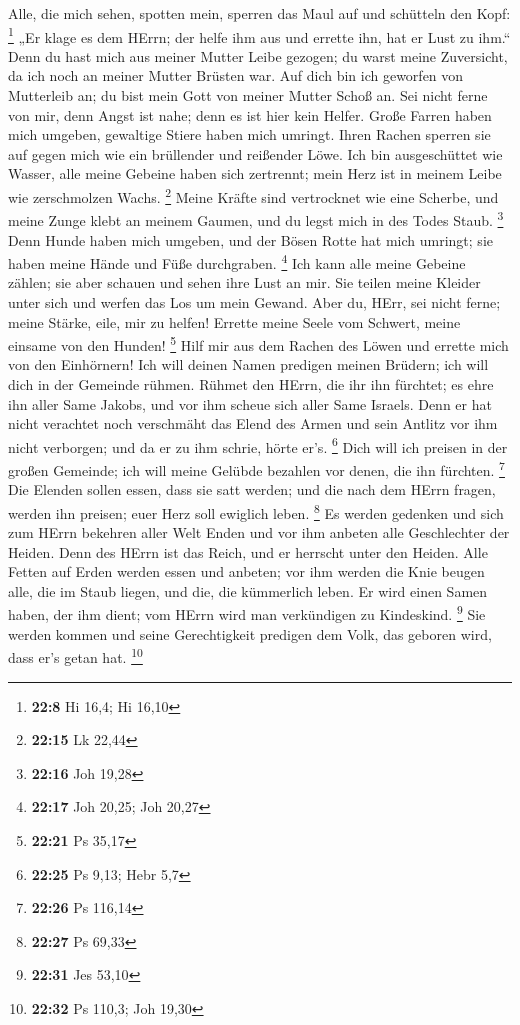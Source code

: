  Alle, die mich sehen, spotten mein, sperren das Maul auf
und schütteln den Kopf: \footnote{\textbf{22:8} Hi 16,4; Hi 16,10}
 „Er klage es dem HErrn; der helfe ihm aus und errette ihn,
hat er Lust zu ihm.``  Denn du hast mich aus meiner Mutter
Leibe gezogen; du warst meine Zuversicht, da ich noch an meiner Mutter
Brüsten war.  Auf dich bin ich geworfen von Mutterleib an;
du bist mein Gott von meiner Mutter Schoß an.  Sei nicht
ferne von mir, denn Angst ist nahe; denn es ist hier kein Helfer.
 Große Farren haben mich umgeben, gewaltige Stiere haben
mich umringt.  Ihren Rachen sperren sie auf gegen mich wie
ein brüllender und reißender Löwe.  Ich bin ausgeschüttet
wie Wasser, alle meine Gebeine haben sich zertrennt; mein Herz ist in
meinem Leibe wie zerschmolzen Wachs. \footnote{\textbf{22:15} Lk 22,44}
 Meine Kräfte sind vertrocknet wie eine Scherbe, und meine
Zunge klebt an meinem Gaumen, und du legst mich in des Todes Staub.
\footnote{\textbf{22:16} Joh 19,28}  Denn Hunde haben mich
umgeben, und der Bösen Rotte hat mich umringt; sie haben meine Hände und
Füße durchgraben. \footnote{\textbf{22:17} Joh 20,25; Joh 20,27}
 Ich kann alle meine Gebeine zählen; sie aber schauen und
sehen ihre Lust an mir.  Sie teilen meine Kleider unter
sich und werfen das Los um mein Gewand.  Aber du, HErr, sei
nicht ferne; meine Stärke, eile, mir zu helfen!  Errette
meine Seele vom Schwert, meine einsame von den Hunden! \footnote{\textbf{22:21}
  Ps 35,17}  Hilf mir aus dem Rachen des Löwen und errette
mich von den Einhörnern!  Ich will deinen Namen predigen
meinen Brüdern; ich will dich in der Gemeinde rühmen. 
Rühmet den HErrn, die ihr ihn fürchtet; es ehre ihn aller Same Jakobs,
und vor ihm scheue sich aller Same Israels.  Denn er hat
nicht verachtet noch verschmäht das Elend des Armen und sein Antlitz vor
ihm nicht verborgen; und da er zu ihm schrie, hörte er's. \footnote{\textbf{22:25}
  Ps 9,13; Hebr 5,7}  Dich will ich preisen in der großen
Gemeinde; ich will meine Gelübde bezahlen vor denen, die ihn fürchten.
\footnote{\textbf{22:26} Ps 116,14}  Die Elenden sollen
essen, dass sie satt werden; und die nach dem HErrn fragen, werden ihn
preisen; euer Herz soll ewiglich leben. \footnote{\textbf{22:27} Ps
  69,33}  Es werden gedenken und sich zum HErrn bekehren
aller Welt Enden und vor ihm anbeten alle Geschlechter der Heiden.
 Denn des HErrn ist das Reich, und er herrscht unter den
Heiden.  Alle Fetten auf Erden werden essen und anbeten;
vor ihm werden die Knie beugen alle, die im Staub liegen, und die, die
kümmerlich leben.  Er wird einen Samen haben, der ihm
dient; vom HErrn wird man verkündigen zu Kindeskind. \footnote{\textbf{22:31}
  Jes 53,10}  Sie werden kommen und seine Gerechtigkeit
predigen dem Volk, das geboren wird, dass er's getan hat. \footnote{\textbf{22:32}
  Ps 110,3; Joh 19,30}

